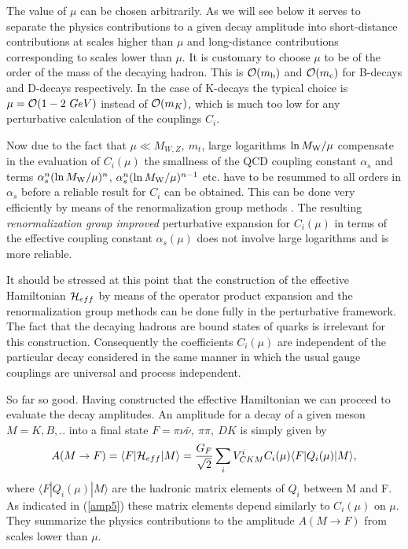 \documentclass[12pt]{article}
\newcommand{\mc}{m_{\rm c}}
\newcommand{\mb}{m_{\rm b}}
\newcommand{\mw}{M_{\rm W}}
\newcommand{\be}{\begin{equation}}
\newcommand{\ee}{\end{equation}}
\newcommand{\ord}{{\cal O}}
\begin{document}
The value of $\mu$ can be chosen arbitrarily. As we will see below it serves 
to separate the physics contributions to a given decay amplitude into
short-distance contributions at scales higher than $\mu$ and long-distance
contributions corresponding to scales lower than $\mu$. It is customary 
to choose
$\mu$ to be of the order of the mass of the decaying hadron. 
This is $\ord (\mb)$ and $\ord(\mc)$ for B-decays and
D-decays respectively. In the case of K-decays the typical choice is
 $\mu=\ord(1-2~GeV)$
instead of $\ord(m_K)$, which is much too low for any perturbative 
calculation of the couplings $C_i$.

Now due to the fact that $\mu\ll  M_{W,Z},~ m_t$, large logarithms 
$\ln\mw/\mu$ compensate in the evaluation of
$C_i(\mu)$ the smallness of the QCD coupling constant $\alpha_s$ and 
terms $\alpha^n_s (\ln\mw/\mu)^n$, $\alpha^n_s (\ln\mw/\mu)^{n-1}$ 
etc. have to be resummed to all orders in $\alpha_s$ before a reliable 
result for $C_i$ can be obtained.
This can be done very efficiently by means of the renormalization group
methods \cite{REGM,HV1,Weinberg}. 
The resulting {\it renormalization group improved} perturbative
expansion for $C_i(\mu)$ in terms of the effective coupling constant 
$\alpha_s(\mu)$ does not involve large logarithms and is more reliable.

It should be stressed at this point that the construction of the effective
Hamiltonian ${\cal H}_{eff}$ by means of the operator product expansion and 
the
renormalization group methods can be done fully in the perturbative framework.
The fact that the decaying hadrons are bound states of quarks is irrelevant
for this construction. Consequently the coefficients $C_i(\mu)$ are 
independent of the
particular decay considered in the same manner in which the usual gauge
couplings are universal and process independent.

So far so good. Having constructed the effective Hamiltonian we can proceed
to evaluate the decay amplitudes. An amplitude for a decay of a given meson 
$M= K, B,..$ into a final state $F=\pi\nu\bar\nu,~\pi\pi,~DK$ is simply 
given by
\be\label{amp5}
A(M\to F)=\langle F|{\cal H}_{eff}|M\rangle
=\frac{G_F}{\sqrt{2}}\sum_i V^i_{CKM}C_i(\mu)\langle F|Q_i(\mu)|M\rangle,
\ee
where $\langle F|Q_i(\mu)|M\rangle$ 
are the hadronic matrix elements of $Q_i$ between M and F. As indicated
in (\ref{amp5}) these matrix elements depend similarly to $C_i(\mu)$ 
on $\mu$. They summarize the physics contributions to the amplitude 
$A(M\to F)$ from scales lower than $\mu$.
\end{document}

